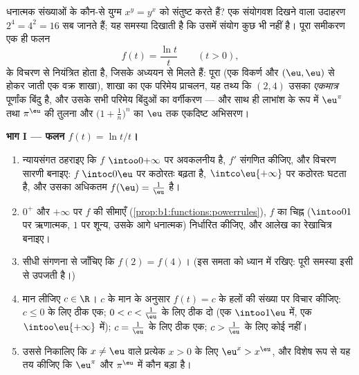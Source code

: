 \begin{problem}\label{pb:b1:functions:1}
धनात्मक संख्याओं के कौन-से युग्म $x^y = y^x$ को संतुष्ट करते हैं? एक संयोगवश
दिखने वाला उदाहरण $2^4 = 4^2 = 16$ सब जानते हैं; यह समस्या दिखाती है कि
उसमें संयोग कुछ भी नहीं है। पूरा समीकरण एक ही फलन
\[
f(t) = \frac{\ln t}{t} \qquad (t > 0),
\]
के विचरण से नियंत्रित होता है, जिसके अध्ययन से मिलते हैं: पूरा 
(एक विकर्ण और $(\eu, \eu)$ से होकर जाती एक वक्र शाखा), शाखा का एक परिमेय
प्राचलन, यह तथ्य कि $(2, 4)$ उसका \emph{एकमात्र} पूर्णांक बिंदु है, और उसके
सभी परिमेय बिंदुओं का वर्गीकरण --- और साथ ही लाभांश के रूप में $\eu^\pi$ तथा
$\pi^\eu$ की तुलना और $\bigl(1 + \frac1n\bigr)^n$ का $\eu$ तक एकदिष्ट
अभिसरण।

\medskip \noindent\textbf{भाग I --- फलन $f(t) = \ln t / t$।}
\begin{enumerate}
  \item न्यायसंगत ठहराइए कि $f$ $\intoo0{+\infty}$ पर अवकलनीय है, $f'$
  संगणित कीजिए, और विचरण सारणी बनाइए: $f$ $\intoc0\eu$ पर कठोरतः बढ़ता है,
  $\intco\eu{+\infty}$ पर कठोरतः घटता है, और उसका अधिकतम $f(\eu) =
  \frac1\eu$ है।
  \item $0^+$ और $+\infty$ पर $f$ की सीमाएँ
  (\cref{prop:b1:functions:powerrules}), $f$ का चिह्न ($\intoo01$ पर
  ऋणात्मक, $1$ पर शून्य, उसके आगे धनात्मक) निर्धारित कीजिए, और आलेख का
  रेखाचित्र बनाइए।
  \item सीधी संगणना से जाँचिए कि $f(2) = f(4)$। (इस समता को ध्यान में रखिए:
  पूरी समस्या इसी से उपजती है।)
  \item मान लीजिए $c \in \R$। $c$ के मान के अनुसार $f(t) = c$ के हलों की
  संख्या पर विचार कीजिए: $c \leq 0$ के लिए ठीक एक; $0 < c < \frac1\eu$ के
  लिए ठीक दो (एक $\intoo1\eu$ में, एक $\intoo\eu{+\infty}$ में); $c =
  \frac1\eu$ के लिए ठीक एक; $c > \frac1\eu$ के लिए कोई नहीं।
  \item उससे निकालिए कि $x \neq \eu$ वाले प्रत्येक $x > 0$ के लिए $\eu^x >
  x^\eu$, और विशेष रूप से यह तय कीजिए कि $\eu^\pi$ और $\pi^\eu$ में कौन बड़ा
  है।
\end{enumerate}


\end{problem}
